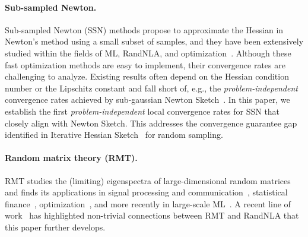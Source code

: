 \paragraph{Sub-sampled Newton.}
Sub-sampled Newton (SSN) methods propose to approximate the Hessian in Newton's method using a small subset of samples, and they have been extensively studied within the fields of ML, RandNLA, and optimization~\citep{xu2016subsampled,bollapragada2019exact,roosta2019subsampled,xu2020newton,ye2021approximate}.
Although these fast optimization methods are easy to implement, their convergence rates are challenging to analyze.
Existing results often depend on the Hessian condition number or the Lipschitz constant and fall short of, e.g., the \emph{problem-independent} convergence rates achieved by sub-gaussian Newton Sketch~\citep{lacotte2019faster,derezinski2021newtonless}.
In this paper, we establish the first \emph{problem-independent} local convergence rates for SSN that closely align with Newton Sketch. 
This addresses the convergence guarantee gap identified in Iterative Hessian Sketch~\citep{pilanci2016iterative} for random sampling.



\paragraph{Random matrix theory (RMT).}
RMT studies the (limiting) eigenspectra of large-dimensional random matrices~\citep{anderson2010introduction} and finds its applications in signal processing and communication~\citep{couillet2011random}, statistical finance~\citep{plerou2002Random}, optimization~\citep{paquette2021SGDa,paquette2023Haltinga}, and more recently in large-scale ML~\citep{pennington2017nonlinear,fan2020spectra,mei2021generalization,couillet2022RMT4ML}.
A recent line of work~\cite{liao2020random,liao2021sparse,liao2021hessian} has highlighted non-trivial connections between RMT and RandNLA that this paper further develops.